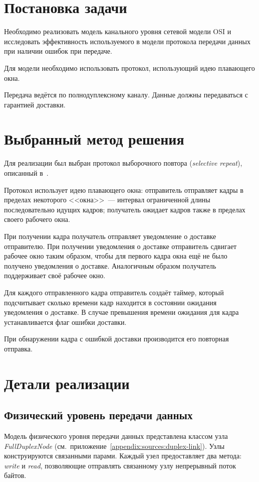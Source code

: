 \documentclass[a4paper,10pt]{article}
\newcommand{\myfunc}[1]{%
\textit{#1}}
\begin{document}


\tableofcontents
\pagebreak


\section{Постановка задачи}
Необходимо реализовать модель канального уровня сетевой модели OSI
и исследовать эффективность используемого в модели протокола передачи данных 
при наличии ошибок при передаче.

Для модели необходимо использовать протокол, 
использующий идею плавающего окна.

Передача ведётся по полнодуплексному каналу.
Данные должны передаваться с гарантией доставки.

\section{Выбранный метод решения}
\label{section:solution}
Для реализации был выбран протокол выборочного повтора (\textit{selective repeat}), 
описанный в~\cite{tanenbaum2003compnet}.

Протокол использует идею плавающего окна:
отправитель отправляет кадры в пределах некоторого <<окна>>~--- 
интервал ограниченной длины последовательно идущих кадров;
получатель ожидает кадров также в пределах своего рабочего окна.

При получении кадра получатель отправляет уведомление о доставке 
отправителю.
При получении уведомления о доставке отправитель сдвигает рабочее окно
таким образом, чтобы для первого кадра окна ещё не было получено
уведомления о доставке.
Аналогичным образом получатель поддерживает своё рабочее окно.

Для каждого отправленного кадра отправитель создаёт таймер, 
который подсчитывает сколько времени кадр находится в состоянии ожидания
уведомления о доставке.
В случае превышения времени ожидания для кадра устанавливается флаг ошибки доставки.

При обнаружении кадра с ошибкой доставки производится его повторная отправка.

\section{Детали реализации}
\subsection{Физический уровень передачи данных}
Модель физического уровня передачи данных представлена 
классом узла \myfunc{FullDuplexNode}
(см.~приложение~\ref{appendix:sources:duplex-link}).
Узлы конструируются связанными парами.
Каждый узел предоставляет два метода: \myfunc{write} и \myfunc{read}, 
позволяющие отправлять связанному узлу непрерывный поток байтов.
\end{document}
